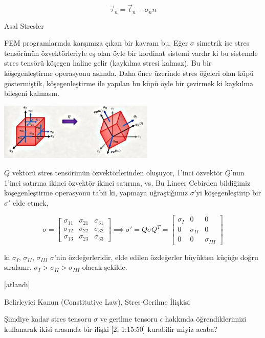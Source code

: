 \documentclass[12pt,fleqn]{article}\usepackage{../../common}
\begin{document}
$$
\vec{\tau}_n  = \vec{t}_n - \sigma_n n
$$

Asal Stresler

FEM programlarında karşımıza çıkan bir kavram bu. Eğer $\sigma$ simetrik ise
stres tensörünün özvektörleriyle eş olan öyle bir kordinat sistemi vardır ki bu
sistemde stres tensörü köşegen haline gelir (kaykılma stresi kalmaz). Bu bir
köşegenleştirme operasyonu aslında.  Daha önce üzerinde stres öğeleri olan küpü
göstermiştik, köşegenleştirme ile yapılan bu küpü öyle bir çevirmek ki kaykılma
bileşeni kalmasın.

\includegraphics[width=20em]{phy_020_strs_02_08.jpg}

$Q$ vektörü stres tensörünün özvektörlerinden oluşuyor, 1'inci özvektör $Q$'nun
1'inci satırına ikinci özvektör ikinci satırına, vs. Bu Lineer Cebirden
bildiğimiz köşegenleştirme operasyonu tabii ki, yapmaya uğraştığımız $\sigma$'yi
köşegenleştirip bir $\sigma'$ elde etmek,

$$
\sigma = 
\left[\begin{array}{ccc}
\sigma_{11} & \sigma_{21} & \sigma_{31} \\
\sigma_{12} & \sigma_{22} & \sigma_{32} \\
\sigma_{13} & \sigma_{23} & \sigma_{33} 
\end{array}\right] \implies
\sigma' = Q \sigma Q^T =
\left[\begin{array}{ccc}
\sigma_I & 0           & 0 \\
0        & \sigma_{II} & 0 \\
0        & 0           & \sigma_{III}
\end{array}\right]
$$

ki $\sigma_I$, $\sigma_{II}$, $\sigma_{III}$ $\sigma$'nin özdeğerleridir, elde
edilen özdeğerler büyükten küçüğe doğru sıralanır, $\sigma_I > \sigma_{II} > \sigma_{III}$
olacak şekilde.

[atlandı]

Belirleyici Kanun (Constitutive Law), Stres-Gerilme İlişkisi

Şimdiye kadar stres tensoru $\sigma$ ve gerilme tensoru $\epsilon$ hakkında
öğrendiklerimizi kullanarak ikisi arasında bir ilişki [2, 1:15:50] kurabilir
miyiz acaba?
\end{document}
